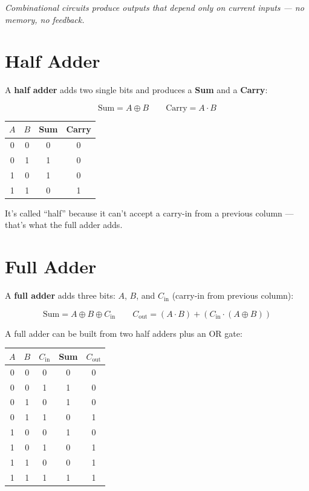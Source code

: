 \documentclass[11pt, letterpaper]{article}
\begin{document}
\vspace{8pt}
\begin{center}\small\itshape
  Combinational circuits produce outputs that depend \emph{only} on current inputs --- no memory, no feedback.
\end{center}

\section*{Half Adder}

A \textbf{half adder} adds two single bits and produces a \textbf{Sum} and a \textbf{Carry}:

\[
  \text{Sum} = A \oplus B \qquad \text{Carry} = A \cdot B
\]

\begin{center}
\renewcommand{\arraystretch}{1.3}
\begin{tabular}{cc|cc}
\toprule
$A$ & $B$ & Sum & Carry \\
\midrule
0 & 0 & 0 & 0 \\
0 & 1 & 1 & 0 \\
1 & 0 & 1 & 0 \\
1 & 1 & 0 & 1 \\
\bottomrule
\end{tabular}
\end{center}

It's called ``half'' because it can't accept a carry-in from a previous column --- that's what the full adder adds.

\section*{Full Adder}

A \textbf{full adder} adds three bits: $A$, $B$, and $C_{\mathrm{in}}$ (carry-in from previous column):

\[
  \text{Sum} = A \oplus B \oplus C_{\mathrm{in}}
  \qquad
  C_{\mathrm{out}} = (A \cdot B) + (C_{\mathrm{in}} \cdot (A \oplus B))
\]

A full adder can be built from two half adders plus an OR gate:

\begin{center}
\renewcommand{\arraystretch}{1.3}
\begin{tabular}{ccc|cc}
\toprule
$A$ & $B$ & $C_{\mathrm{in}}$ & Sum & $C_{\mathrm{out}}$ \\
\midrule
0&0&0 & 0 & 0 \\
0&0&1 & 1 & 0 \\
0&1&0 & 1 & 0 \\
0&1&1 & 0 & 1 \\
1&0&0 & 1 & 0 \\
1&0&1 & 0 & 1 \\
1&1&0 & 0 & 1 \\
1&1&1 & 1 & 1 \\
\bottomrule
\end{tabular}
\end{center}
\end{document}
